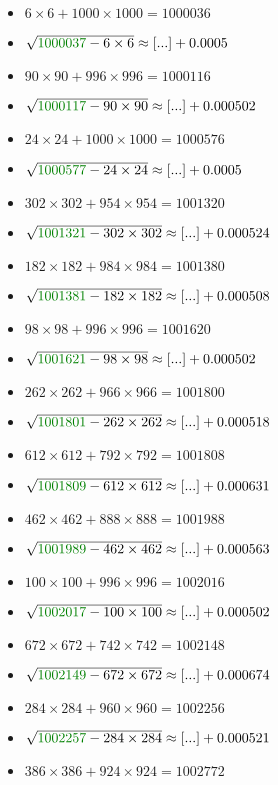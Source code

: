 \documentclass[12pt]{article}
\begin{document}
\begin{multicols}{2}
\begin{itemize}
\item $6×6 + 1000×1000 = 1000036$
\item $\sqrt{ {\color{green!50!black}{1000037}} - 6\times 6 } \approx [...] + 0.0005$
\item $90×90 + 996×996 = 1000116$
\item $\sqrt{ {\color{green!50!black}{1000117}} - 90\times 90 } \approx [...] + 0.000502$
\item $24×24 + 1000×1000 = 1000576$
\item $\sqrt{ {\color{green!50!black}{1000577}} - 24\times 24 } \approx [...] + 0.0005$
\item $302×302 + 954×954 = 1001320$
\item $\sqrt{ {\color{green!50!black}{1001321}} - 302\times 302 } \approx [...] + 0.000524$
\item $182×182 + 984×984 = 1001380$
\item $\sqrt{ {\color{green!50!black}{1001381}} - 182\times 182 } \approx [...] + 0.000508$
\item $98×98 + 996×996 = 1001620$
\item $\sqrt{ {\color{green!50!black}{1001621}} - 98\times 98 } \approx [...] + 0.000502$
\item $262×262 + 966×966 = 1001800$
\item $\sqrt{ {\color{green!50!black}{1001801}} - 262\times 262 } \approx [...] + 0.000518$
\item $612×612 + 792×792 = 1001808$
\item $\sqrt{ {\color{green!50!black}{1001809}} - 612\times 612 } \approx [...] + 0.000631$
\item $462×462 + 888×888 = 1001988$
\item $\sqrt{ {\color{green!50!black}{1001989}} - 462\times 462 } \approx [...] + 0.000563$
\item $100×100 + 996×996 = 1002016$
\item $\sqrt{ {\color{green!50!black}{1002017}} - 100\times 100 } \approx [...] + 0.000502$
\item $672×672 + 742×742 = 1002148$
\item $\sqrt{ {\color{green!50!black}{1002149}} - 672\times 672 } \approx [...] + 0.000674$
\item $284×284 + 960×960 = 1002256$
\item $\sqrt{ {\color{green!50!black}{1002257}} - 284\times 284 } \approx [...] + 0.000521$
\item $386×386 + 924×924 = 1002772$

\end{itemize}
\end{multicols}
\end{document}
